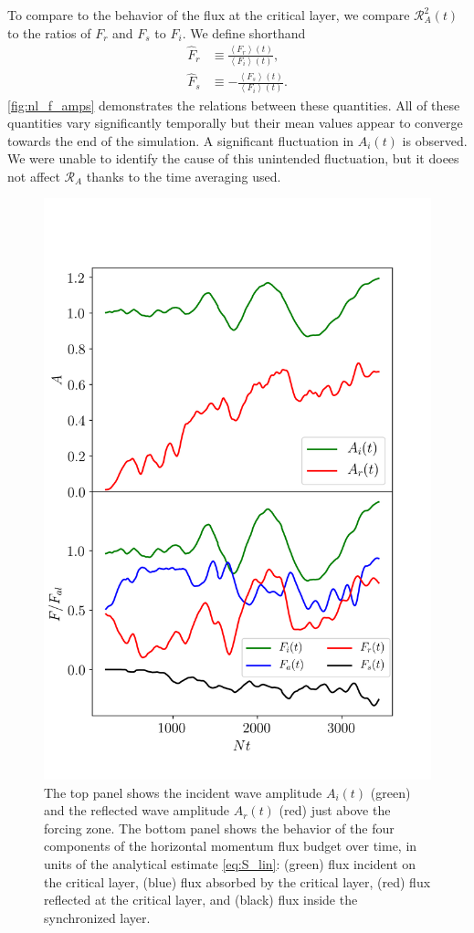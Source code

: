 \documentclass[
        fleqn,
        usenatbib,
        referee,
    ]{mnras}
\newcommand*{\ev}[1]{\left\langle#1\right\rangle}
\begin{document}
To compare to the behavior of the flux at the critical layer, we compare
$\mathcal{R}_A^2(t)$ to the ratios of $F_r$ and $F_s$ to $F_i$. We define
shorthand
\begin{align}
    \hat{F}_r &\equiv \frac{\ev{F_r}(t)}{\ev{F_i}(t)},
        \label{eq:srefl_def1}\\
    \hat{F}_s &\equiv -\frac{\ev{F_s}(t)}{\ev{F_i}(t)}.
        \label{eq:srefl_def}
\end{align}
\autoref{fig:nl_f_amps} demonstrates the relations between these quantities. All
of these quantities vary significantly temporally but their mean values appear
to converge towards the end of the simulation. A significant fluctuation in
$A_i(t)$ is observed. We were unable to identify the cause of this unintended
fluctuation, but it doees not affect $\mathcal{R}_A$ thanks to the time
averaging used.
\begin{figure}
    \centering
    \includegraphics[width=0.8\columnwidth]{plots/nl_f_amps.png}
    \caption{The top panel shows the incident wave amplitude $A_i(t)$ (green)
    and the reflected wave amplitude $A_r(t)$ (red) just above the forcing zone.
    The bottom panel shows the behavior of the four components of the horizontal
    momentum flux budget over time, in units of the analytical estimate
    \autoref{eq:S_lin}: (green) flux incident on the critical layer, (blue) flux
    absorbed by the critical layer, (red) flux reflected at the critical layer,
    and (black) flux inside the synchronized layer.}\label{fig:nl_f_amps}
\end{figure}
\end{document}
